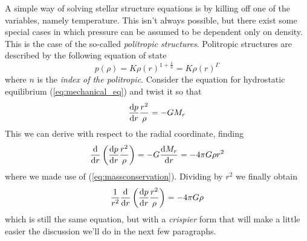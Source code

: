 A simple way of solving stellar structure equations is by killing off one of the variables, namely temperature. This isn't always possible, but there exist some special cases in which pressure can be assumed to be dependent only on density. This is the case of the so-called \emph{politropic structures}. Politropic structures are described by the following equation of state
\begin{equation}
	p(\rho) = K\rho(r)^{1+\frac{1}{n}} = K\rho(r)^{\Gamma}
	\label{eq:politropic}
\end{equation}
where $n$ is the \emph{index of the politropic}. Consider the equation for hydrostatic equilibrium (\ref{eq:mechanical_eq}) and twist it so that
\begin{equation*}
	\frac{\text{d}p}{\text{d}r}\frac{r^{2}}{\rho} = -GM_{r}
\end{equation*}
This we can derive with respect to the radial coordinate, finding
\begin{equation*}
	\frac{\text{d}}{\text{d}r}\left(\frac{\text{d}p}{\text{d}r}\frac{r^{2}}{\rho}\right) = -G\frac{\text{d}M_{r}}{\text{d}r} = -4\pi G \rho r^{2}
\end{equation*}
where we made use of (\ref{eq:massconservation}). Dividing by $r^{2}$ we finally obtain
\begin{equation}
	\frac{1}{r^{2}}\frac{\text{d}}{\text{d}r}\left(\frac{\text{d}p}{\text{d}r}\frac{r^{2}}{\rho}\right) = -4\pi G \rho
	\label{eq:proto_le}
\end{equation}
which is still the same equation, but with a \emph{crispier} form that will make a little easier the discussion we'll do in the next few paragraphs.

